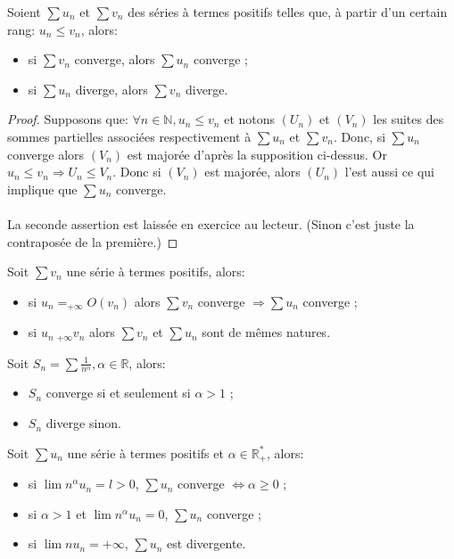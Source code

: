 \documentclass[12pt]{article}
\newenvironment{theorem}[2][Théorème]{\begin{trivlist}
\item[\hskip \labelsep {\bfseries #1}\hskip \labelsep {\bfseries #2.}]}{\end{trivlist}}
\newenvironment{definition}[2][Définition]{\begin{trivlist}
\item[\hskip \labelsep {\bfseries #1}\hskip \labelsep {\bfseries #2.}]}{\end{trivlist}}
\begin{document}
\bigskip
\begin{definition}{}
Soient $\sum u_n$ et $\sum v_n$ des séries à termes positifs telles que, à partir d'un certain rang: $u_n \leq v_n$, alors:
\begin{itemize}
    \item si $\sum v_n$ converge, alors $\sum u_n$ converge ;
    \item si $\sum u_n$ diverge, alors $\sum v_n$ diverge.
\end{itemize}
\end{definition}
\begin{proof}
 Supposons que: $\forall n \in \mathbb{N}, u_n \le v_n$ et notons $(U_n)$ et $(V_n)$ les suites des sommes partielles associées respectivement à $\sum u_n$ et $\sum v_n$.
 Donc, si $\sum u_n$ converge alors $(V_n)$ est majorée d'après la supposition ci-dessus. Or $u_n \leq v_n \Rightarrow U_n \leq V_n$. Donc si $(V_n)$ est majorée, alors $(U_n)$ l'est aussi ce qui implique que $\sum u_n$ converge.
\\
\\
La seconde assertion est laissée en exercice au lecteur. (Sinon c'est juste la contraposée de la première.)
\end{proof}
 \bigskip
\begin{theorem}{des équivalents}
Soit $\sum v_n$ une série à termes positifs, alors:
\begin{itemize}
    \item si $u_n =_{+\infty}O(v_n)$ alors $\sum v_n$ converge $\Rightarrow \sum u_n$ converge ;
    \item si $u_n ~_{+\infty}v_n$ alors $\sum v_n$ et $\sum u_n$ sont de mêmes natures.
\end{itemize}
\end{theorem}
\bigskip
\begin{definition}{: Séries de Riemann}
Soit $S_n=\sum\frac{1}{n^\alpha}, \alpha \in \mathbb{R}$, alors:
\begin{itemize}
    \item $S_n$ converge si et seulement si $\alpha > 1$ ;
    \item $S_n$ diverge sinon.
\end{itemize}
\end{definition}
\bigskip
\begin{definition}{\hypertarget{riemannCritere}{: Critère de Riemann}}
Soit $\sum u_n$ une série à termes positifs et $\alpha \in \mathbb{R^*_+}$, alors:
\begin{itemize}
    \item si $\lim n^\alpha u_n = l > 0$, $\sum u_n$ converge $\Leftrightarrow \alpha \ge 0$ ;
    \item si $\alpha > 1$ et $\lim n^\alpha u_n = 0$, $\sum u_n$ converge ;
    \item si $\lim nu_n = +\infty$, $\sum u_n$ est divergente.
\end{itemize}
\end{definition}
\end{document}
